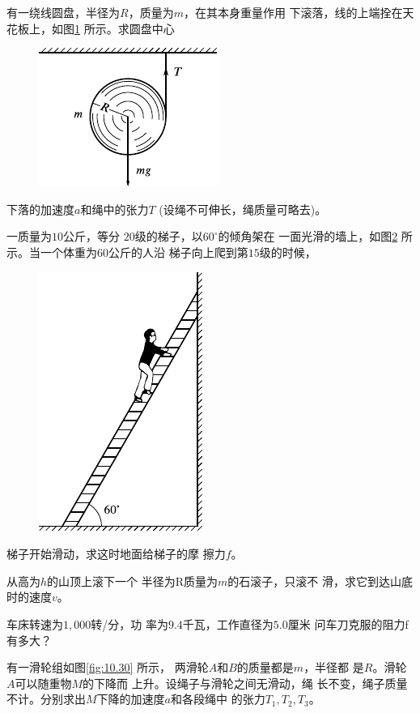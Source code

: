 \begin{exercises}
\exercise 有一绕线圆盘，半径为$ R $，质量为$ m $，在其本身重量作用
下滚落，线的上端拴在天花板上，如图\ref{fig:10.28} 所示。求圆盘中心
\begin{figure}
    \centering
    \includegraphics{figure/fig10.28}
    \caption{}
    \label{fig:10.28}
\end{figure}
下落的加速度$ a $和绳中的张力$ T $
(设绳不可伸长，绳质量可略去)。

\exercise 一质量为$ 10 $公斤，等分
$ 20 $级的梯子，以$ 60^\circ $的倾角架在
一面光滑的墙上，如图\ref{fig:10.29} 所
示。当一个体重为$ 60 $公斤的人沿
梯子向上爬到第$ 15 $级的时候，

\clearpage\noindent
\begin{figure}
    \centering
    \includegraphics{figure/fig10.29}
    \caption{}
    \label{fig:10.29}
\end{figure}
梯子开始滑动，求这时地面给梯子的摩
擦力$  f  $。

\exercise 从高为$ h $的山顶上滚下一个
半径为R质量为$ m $的石滚子，只滚不
滑，求它到达山底时的速度$ v $。

\exercise 车床转速为$ 1,000 $转/分，功
率为$ 9.4 $千瓦，工作直径为$ 5.0 $厘米
问车刀克服的阻力f有多大？

\exercise 有一滑轮组如图\ref{fig:10.30} 所示，
两滑轮$ A $和$ B $的质量都是$ m $，半径都
是$ R $。滑轮$ A $可以随重物$ M $的下降而
上升。设绳子与滑轮之间无滑动，绳
长不变，绳子质量不计。分别求出$ M $下降的加速度$ a $和各段绳中
的张力$  T _ { 1 } , T _ { 2 } , T _ { 3 } $。


\end{exercises}
